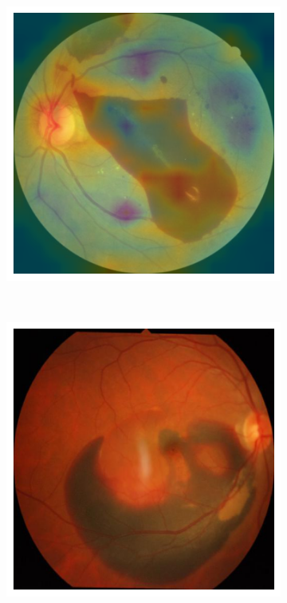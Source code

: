 \documentclass[twocolumn, fontsize=10pt]{article}
\begin{document}
\begin{appendices}
\begin{figure}[H]
\begin{subfigure}[b]{0.2\textwidth}
    \end{subfigure}
    \hspace{5mm}
    \begin{subfigure}[b]{0.2\textwidth}
        \raggedright
        \includegraphics[width=\textwidth]{cabnet-heatmap-1.png}
    \end{subfigure} \\
    \vspace{5mm}
    \begin{subfigure}[b]{0.2\textwidth}
        \raggedleft
        \includegraphics[width=\textwidth]{image-2.png}

\end{subfigure}
\end{figure}
\end{appendices}
\end{document}
